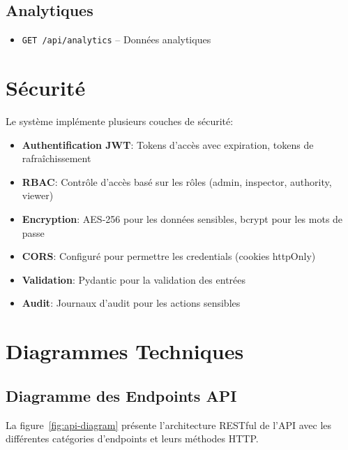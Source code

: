 \documentclass[12pt,a4paper]{article}
\begin{document}
\subsection{Analytiques}
\begin{itemize}
    \item \texttt{GET /api/analytics} -- Données analytiques
\end{itemize}

\section{Sécurité}

Le système implémente plusieurs couches de sécurité:

\begin{itemize}
    \item \textbf{Authentification JWT}: Tokens d'accès avec expiration, tokens de rafraîchissement
    \item \textbf{RBAC}: Contrôle d'accès basé sur les rôles (admin, inspector, authority, viewer)
    \item \textbf{Encryption}: AES-256 pour les données sensibles, bcrypt pour les mots de passe
    \item \textbf{CORS}: Configuré pour permettre les credentials (cookies httpOnly)
    \item \textbf{Validation}: Pydantic pour la validation des entrées
    \item \textbf{Audit}: Journaux d'audit pour les actions sensibles
\end{itemize}

\clearpage
\section{Diagrammes Techniques}

\subsection{Diagramme des Endpoints API}

La figure~\ref{fig:api-diagram} présente l'architecture RESTful de l'API avec les différentes catégories d'endpoints et leurs méthodes HTTP.
\end{document}
